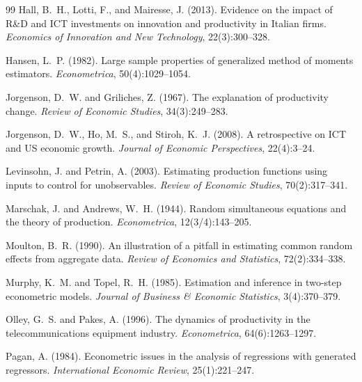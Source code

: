 \documentclass[11pt,a4paper]{article}
\begin{document}
\begin{thebibliography}{99}
Hall, B.~H., Lotti, F., and Mairesse, J. (2013).
\newblock Evidence on the impact of R\&D and ICT investments on innovation and productivity in Italian firms.
\newblock \emph{Economics of Innovation and New Technology}, 22(3):300--328.

Hansen, L.~P. (1982).
\newblock Large sample properties of generalized method of moments estimators.
\newblock \emph{Econometrica}, 50(4):1029--1054.

Jorgenson, D.~W. and Griliches, Z. (1967).
\newblock The explanation of productivity change.
\newblock \emph{Review of Economic Studies}, 34(3):249--283.

Jorgenson, D.~W., Ho, M.~S., and Stiroh, K.~J. (2008).
\newblock A retrospective on ICT and US economic growth.
\newblock \emph{Journal of Economic Perspectives}, 22(4):3--24.

Levinsohn, J. and Petrin, A. (2003).
\newblock Estimating production functions using inputs to control for unobservables.
\newblock \emph{Review of Economic Studies}, 70(2):317--341.

Marschak, J. and Andrews, W.~H. (1944).
\newblock Random simultaneous equations and the theory of production.
\newblock \emph{Econometrica}, 12(3/4):143--205.

Moulton, B.~R. (1990).
\newblock An illustration of a pitfall in estimating common random effects from aggregate data.
\newblock \emph{Review of Economics and Statistics}, 72(2):334--338.

Murphy, K.~M. and Topel, R.~H. (1985).
\newblock Estimation and inference in two-step econometric models.
\newblock \emph{Journal of Business \& Economic Statistics}, 3(4):370--379.

Olley, G.~S. and Pakes, A. (1996).
\newblock The dynamics of productivity in the telecommunications equipment industry.
\newblock \emph{Econometrica}, 64(6):1263--1297.

Pagan, A. (1984).
\newblock Econometric issues in the analysis of regressions with generated regressors.
\newblock \emph{International Economic Review}, 25(1):221--247.


\end{thebibliography}
\end{document}
